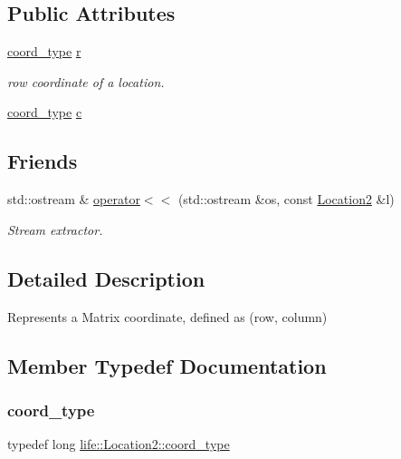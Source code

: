 \subsection*{Public Attributes}
\begin{DoxyCompactItemize}
\item 
\mbox{\hyperlink{structlife_1_1_location2_abad0c81db789cf9a9f4396ac0c0ef06b}{coord\+\_\+type}} \mbox{\hyperlink{structlife_1_1_location2_a30da62b5cddae401fdbc16546cf8806e}{r}}
\begin{DoxyCompactList}\small\item\em row coordinate of a location. \end{DoxyCompactList}\item 
\mbox{\hyperlink{structlife_1_1_location2_abad0c81db789cf9a9f4396ac0c0ef06b}{coord\+\_\+type}} \mbox{\hyperlink{structlife_1_1_location2_a00720fe856afcb622f5393ba72770a5c}{c}}
\end{DoxyCompactItemize}
\subsection*{Friends}
\begin{DoxyCompactItemize}
\item 
std\+::ostream \& \mbox{\hyperlink{structlife_1_1_location2_a44085618a718042868c38885bbde7fa8}{operator$<$$<$}} (std\+::ostream \&os, const \mbox{\hyperlink{structlife_1_1_location2}{Location2}} \&l)
\begin{DoxyCompactList}\small\item\em Stream extractor. \end{DoxyCompactList}\end{DoxyCompactItemize}


\subsection{Detailed Description}
Represents a Matrix coordinate, defined as (row, column) 

\subsection{Member Typedef Documentation}
\mbox{\label{structlife_1_1_location2_abad0c81db789cf9a9f4396ac0c0ef06b}} 
\subsubsection{\texorpdfstring{coord\_type}{coord\_type}}
{\footnotesize\ttfamily typedef long \mbox{\hyperlink{structlife_1_1_location2_abad0c81db789cf9a9f4396ac0c0ef06b}{life\+::\+Location2\+::coord\+\_\+type}}}



